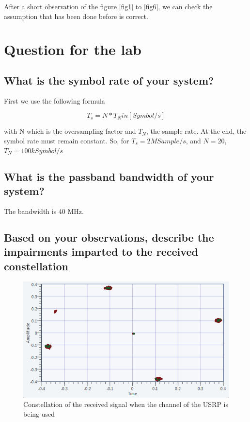 \documentclass[frenchb, oneside, headings=normal]{scrartcl}
\begin{document}
After a short observation of the figure \ref{fig1} to \ref{fig6}, we can check the assumption that has been done before is correct. 


\newpage
\section{Question for the lab}

\subsection{What is the symbol rate of your system?}

First we use the following formula

\begin{equation}
T_s=N*T_N in [Symbol/s]
\end{equation}

with N which is the oversampling factor and $T_N$, the sample rate. At the end, the symbol rate must remain constant. So, for $T_s=2M Sample/s$, and $N=20$, \textbf{$T_N=100 kSymbol/s$}

\subsection{What is the passband bandwidth of your system?}

The bandwidth is 40 MHz.

\subsection{Based on your observations, describe the impairments imparted to the received constellation}

\begin{figure}[ht!]
\centering
\includegraphics[scale=0.9]{img/USRP-Rotate.png}
\caption{Constellation of the received signal when the channel of the USRP is being used}
\label{usrp}
\end{figure}
\end{document}
